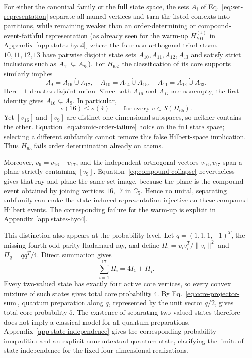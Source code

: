 \documentclass[
  aps,
  pra,
  reprint,
  superscriptaddress,
  amsmath,
  amssymb,
  nofootinbib,
  floatfix
]{revtex4-2}
\theoremstyle{definition}
\theoremstyle{remark}
\newcommand{\YO}{\mathrm{YO}}
\begin{document}
For either the canonical family or the full state space, the sets $A_i$ of Eq.~\eqref{eq:set-representation} separate all named vertices and turn the listed contexts into partitions, while remaining weaker than an order-determining or compound-event-faithful representation (as already seen for the warm-up $H_{\YO}^{(4)}$ in Appendix~\ref{app:states-hyo4}, where the four non-orthogonal triad atoms $10,11,12,13$ have pairwise disjoint state sets $A_{10},A_{11},A_{12},A_{13}$ and satisfy strict inclusions such as $A_{11}\subsetneq A_{25}$). For $H_{65}$, the classification of its core supports similarly implies
\begin{equation}\label{eq:compound-collapse}
A_9=A_{16}\mathbin{\dot\cup}A_{17},\quad
A_{10}=A_{14}\mathbin{\dot\cup}A_{15},\quad
A_{11}=A_{12}\mathbin{\dot\cup}A_{13}.
\end{equation}
Here $\dot\cup$ denotes disjoint union. Since both $A_{16}$ and $A_{17}$ are nonempty, the first identity gives $A_{16}\subsetneq A_9$. In particular,
\begin{equation}\label{eq:atomic-order-failure}
s(16)\le s(9)\qquad\text{for every }s\in\mathcal{S}(H_{65}).
\end{equation}
Yet $[v_{16}]$ and $[v_9]$ are distinct one-dimensional subspaces, so neither contains the other. Equation~\eqref{eq:atomic-order-failure} holds on the full state space; selecting a different subfamily cannot remove this false Hilbert-space implication. Thus $H_{65}$ fails order determination already on atoms.

Moreover, $v_9=v_{16}-v_{17}$, and the independent orthogonal vectors $v_{16},v_{17}$ span a plane strictly containing $[v_9]$. Equation~\eqref{eq:compound-collapse} nevertheless gives that ray and plane the same set image, because the plane is the compound event obtained by joining vertices $16,17$ in $C_5$. Hence no unital, separating subfamily can make the state-induced representation injective on these compound Hilbert events. The corresponding failure for the warm-up is explicit in Appendix~\ref{app:states-hyo4}.

This distinction also appears at the probability level. Let $q=(1,1,1,-1)^T$, the missing fourth odd-parity Hadamard ray, and define $\Pi_i=v_iv_i^T/\|v_i\|^2$ and $\Pi_q=qq^T/4$. Direct summation gives
\begin{equation}\label{eq:core-projector-sum}
\sum_{i=1}^{17}\Pi_i=4I_4+\Pi_q.
\end{equation}
Every two-valued state has exactly four active core vertices, so every convex mixture of such states gives total core probability $4$. By Eq.~\eqref{eq:core-projector-sum}, quantum preparation along $q$, represented by the unit vector $q/2$, gives total core probability $5$. The existence of separating two-valued states therefore does not imply a classical model for all quantum preparations. Appendix~\ref{app:state-independence} gives the corresponding probability inequalities and an explicit noncontextual quantum state, clarifying the limits of state independence for the fixed four-dimensional realizations.
\end{document}
